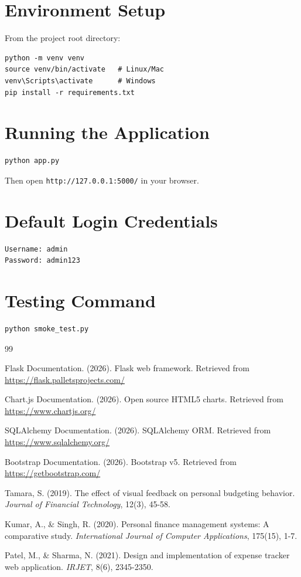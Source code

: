 \section{Environment Setup}
From the project root directory:
\begin{verbatim}
python -m venv venv
source venv/bin/activate   # Linux/Mac
venv\Scripts\activate      # Windows
pip install -r requirements.txt
\end{verbatim}

\section{Running the Application}
\begin{verbatim}
python app.py
\end{verbatim}
Then open \texttt{http://127.0.0.1:5000/} in your browser.

\section{Default Login Credentials}
\begin{verbatim}
Username: admin
Password: admin123
\end{verbatim}

\section{Testing Command}
\begin{verbatim}
python smoke_test.py
\end{verbatim}
\renewcommand{\bibname}{References}
\begin{thebibliography}{99}

 Flask Documentation. (2026). Flask web framework. Retrieved from \url{https://flask.palletsprojects.com/}

 Chart.js Documentation. (2026). Open source HTML5 charts. Retrieved from \url{https://www.chartjs.org/}

 SQLAlchemy Documentation. (2026). SQLAlchemy ORM. Retrieved from \url{https://www.sqlalchemy.org/}

 Bootstrap Documentation. (2026). Bootstrap v5. Retrieved from \url{https://getbootstrap.com/}

 Tamara, S. (2019). The effect of visual feedback on personal budgeting behavior. \textit{Journal of Financial Technology}, 12(3), 45-58.

 Kumar, A., \& Singh, R. (2020). Personal finance management systems: A comparative study. \textit{International Journal of Computer Applications}, 175(15), 1-7.

 Patel, M., \& Sharma, N. (2021). Design and implementation of expense tracker web application. \textit{IRJET}, 8(6), 2345-2350.

\end{thebibliography}

